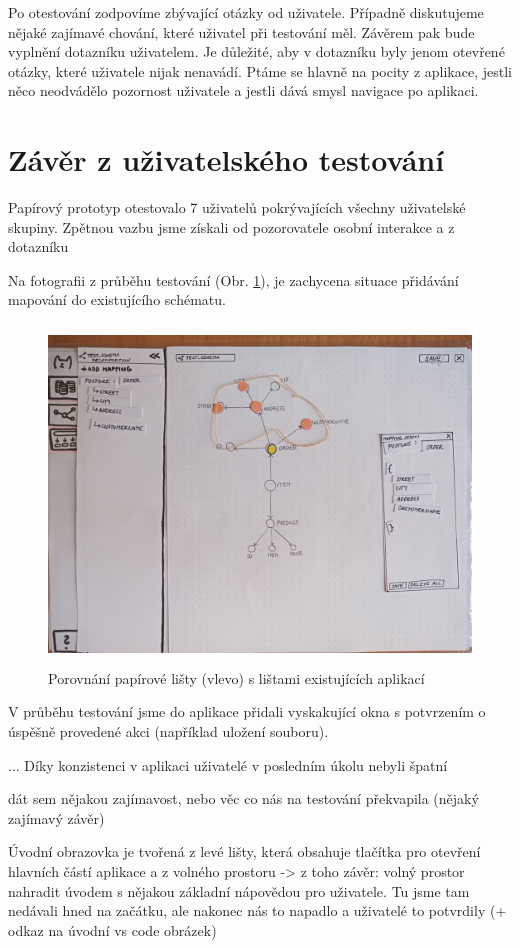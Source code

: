 Po otestování zodpovíme zbývající otázky od uživatele. Případně diskutujeme nějaké zajímavé chování, které uživatel při testování měl. Závěrem pak bude vyplnění dotazníku uživatelem. Je důležité, aby v dotazníku byly jenom otevřené otázky, které uživatele nijak nenavádí. Ptáme se hlavně na pocity z aplikace, jestli něco neodvádělo pozornost uživatele a jestli dává smysl navigace po aplikaci.

\section{Závěr z uživatelského testování}


Papírový prototyp otestovalo 7 uživatelů pokrývajících všechny uživatelské skupiny. Zpětnou vazbu jsme získali od pozorovatele osobní interakce a z dotazníku 

Na fotografii z průběhu testování (Obr. \ref{obr05:ukazka-testovani}), je zachycena situace přidávání mapování do existujícího schématu.

\begin{figure}[htb]
  \centering
  \includegraphics[height=90mm]{../img/ukazka-testovani}
  \caption{Porovnání papírové lišty (vlevo) s lištami existujících aplikací}
  \label{obr05:ukazka-testovani}
\end{figure}

V průběhu testování jsme do aplikace přidali vyskakující okna s potvrzením o úspěšně provedené akci (například uložení souboru). 


... Díky konzistenci v aplikaci uživatelé v posledním úkolu nebyli špatní

dát sem nějakou zajímavost, nebo věc co nás na testování překvapila (nějaký zajímavý závěr)

Úvodní obrazovka je tvořená z levé lišty, která obsahuje tlačítka pro otevření hlavních částí aplikace a z volného prostoru -> z toho závěr: volný prostor nahradit úvodem s nějakou základní nápovědou pro uživatele. Tu jsme tam nedávali hned na začátku, ale nakonec nás to napadlo a uživatelé to potvrdily (+ odkaz na úvodní vs code obrázek)